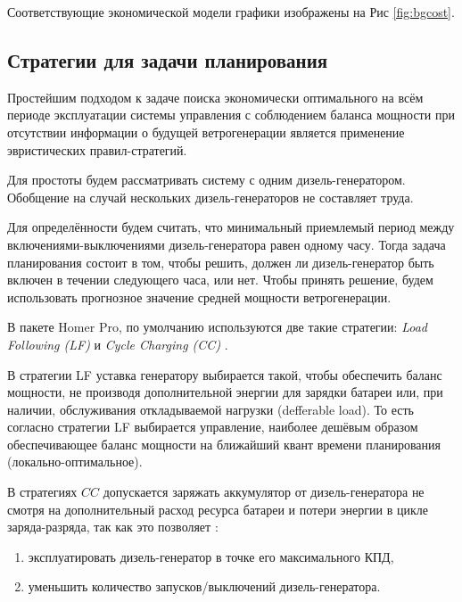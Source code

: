 Соответствующие экономической модели графики изображены на Рис \ref{fig:bgcost}.

\subsection{Стратегии для задачи планирования}
\label{sec:strategies}

Простейшим подходом к задаче поиска экономически оптимального на всём периоде эксплуатации системы управления с соблюдением баланса мощности при отсутствии информации о будущей ветрогенерации является применение эвристических правил-стратегий.

Для простоты будем рассматривать систему с одним дизель-генератором. 
Обобщение на случай нескольких дизель-генераторов не составляет труда.

Для определённости будем считать, что минимальный приемлемый период между включениями-выключениями дизель-генератора равен одному часу.
Тогда задача планирования состоит в том, чтобы решить, должен ли дизель-генератор быть включен в течении следующего часа, или нет.
Чтобы принять решение, будем использовать прогнозное значение средней мощности ветрогенерации.
\cite{foley2012current}



В пакете Homer Pro, по умолчанию используются две такие стратегии: \textit{Load Following (LF)} \cite{lf} и \textit{Cycle Charging (CC)} \cite{cc}.

В стратегии LF уставка генератору выбирается такой, чтобы обеспечить баланс мощности, не производя дополнительной энергии для зарядки батареи или, при наличии, обслуживания откладываемой нагрузки (defferable load).
То есть согласно стратегии LF выбирается управление, наиболее дешёвым образом обеспечивающее баланс мощности на ближайший квант времени планирования (локально-оптимальное).

В стратегиях $CC$ допускается заряжать аккумулятор от дизель-генератора не смотря на дополнительный расход ресурса батареи и потери энергии в цикле заряда-разряда, так как это позволяет \cite{Barley1996}:
\begin{enumerate}
    \item  эксплуатировать дизель-генератор в точке его максимального КПД,
    \item уменьшить количество запусков/выключений дизель-генератора.
\end{enumerate}

